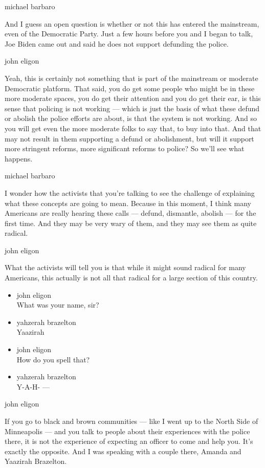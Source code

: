 michael barbaro

And I guess an open question is whether or not this has entered the
mainstream, even of the Democratic Party. Just a few hours before you
and I began to talk, Joe Biden came out and said he does not support
defunding the police.

john eligon

Yeah, this is certainly not something that is part of the mainstream or
moderate Democratic platform. That said, you do get some people who
might be in these more moderate spaces, you do get their attention and
you do get their ear, is this sense that policing is not working ---
which is just the basis of what these defund or abolish the police
efforts are about, is that the system is not working. And so you will
get even the more moderate folks to say that, to buy into that. And that
may not result in them supporting a defund or abolishment, but will it
support more stringent reforms, more significant reforms to police? So
we'll see what happens.

michael barbaro

I wonder how the activists that you're talking to see the challenge of
explaining what these concepts are going to mean. Because in this
moment, I think many Americans are really hearing these calls ---
defund, dismantle, abolish --- for the first time. And they may be very
wary of them, and they may see them as quite radical.

john eligon

What the activists will tell you is that while it might sound radical
for many Americans, this actually is not all that radical for a large
section of this country.

\begin{itemize}
\item
  john eligon\\
  What was your name, sir?
\item
  yahzerah brazelton\\
  Yaazirah
\item
  john eligon\\
  How do you spell that?
\item
  yahzerah brazelton\\
  Y-A-H- ---
\end{itemize}

john eligon

If you go to black and brown communities --- like I went up to the North
Side of Minneapolis --- and you talk to people about their experiences
with the police there, it is not the experience of expecting an officer
to come and help you. It's exactly the opposite. And I was speaking with
a couple there, Amanda and Yaazirah Brazelton.

